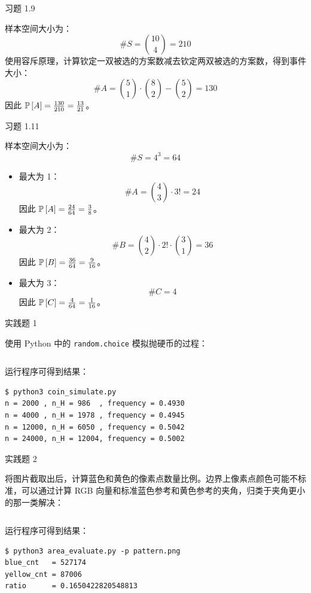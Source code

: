\begin{problem}
	习题 1.9
	\begin{solution}
		样本空间大小为：
		$$
		\# S = \binom{10}{4} = 210
		$$
		使用容斥原理，计算钦定一双被选的方案数减去钦定两双被选的方案数，得到事件大小：
		$$
		\# A = \binom{5}{1} \cdot \binom{8}{2} - \binom{5}{2} = 130
		$$
		因此 $\operatorname{\mathbb{P}}\left[A\right] = \frac{130}{210} = \frac{13}{21}$。
	\end{solution}
\end{problem}

\begin{problem}
	习题 1.11
	\begin{solution}
		样本空间大小为：
		$$
		\# S = 4^3 = 64
		$$
		\begin{itemize}
			\item 最大为 1：
			$$
			\# A = \binom{4}{3} \cdot 3! = 24
			$$
			因此 $\operatorname{\mathbb{P}}\left[A\right] = \frac{24}{64} = \frac{3}{8}$。

			\item 最大为 2：
			$$
			\# B = \binom{4}{2} \cdot 2! \cdot \binom{3}{1} = 36
			$$
			因此 $\operatorname{\mathbb{P}}\left[B\right] = \frac{36}{64} = \frac{9}{16}$。

			\item 最大为 3：
			$$
			\# C = 4
			$$
			因此 $\operatorname{\mathbb{P}}\left[C\right] = \frac{4}{64} = \frac{1}{16}$。
		\end{itemize}
	\end{solution}
\end{problem}

\begin{problem}
	实践题 1
	\begin{solution}
		使用 Python 中的 \texttt{random.choice} 模拟抛硬币的过程：

		\inputminted[label=coin\_simulate.py]{python}{概率与数理模型/src/hw1/coin_simulate.py}

		运行程序可得到结果：
		\begin{verbatim}
$ python3 coin_simulate.py
n = 2000 , n_H = 986  , frequency = 0.4930
n = 4000 , n_H = 1978 , frequency = 0.4945
n = 12000, n_H = 6050 , frequency = 0.5042
n = 24000, n_H = 12004, frequency = 0.5002
		\end{verbatim}
	\end{solution}
\end{problem}

\begin{problem}
	实践题 2
	\begin{solution}
		将图片截取出后，计算蓝色和黄色的像素点数量比例。边界上像素点颜色可能不标准，可以通过计算 RGB 向量和标准蓝色参考和黄色参考的夹角，归类于夹角更小的那一类解决：

		\inputminted[label=area\_evaluate.py]{python}{概率与数理模型/src/hw1/area_evaluate.py}

		运行程序可得到结果：
		\begin{verbatim}
$ python3 area_evaluate.py -p pattern.png
blue_cnt   = 527174
yellow_cnt = 87006
ratio      = 0.1650422820548813
		\end{verbatim}
	\end{solution}
\end{problem}

